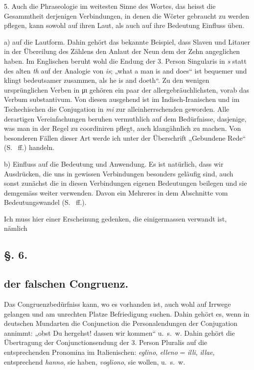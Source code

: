 {5. Auch die Phraseologie im weitesten Sinne des Wortes, das heisst die Gesammtheit derjenigen Verbindungen, in denen die Wörter gebraucht zu werden pflegen, kann sowohl auf ihren Laut, als auch auf ihre Bedeutung Einfluss üben.

a) auf die Lautform. Dahin gehört das bekannte Beispiel, dass Slaven und Litauer in der Übereilung des Zählens den Anlaut der Neun dem der Zehn angeglichen haben. Im Englischen beruht wohl die Endung der 3. Person Singularis in \textit{s} statt des alten \textit{th} auf der Analogie von \textit{is}; „what a man is and does“ ist bequemer und klingt bedeutsamer zusammen, als  he is and doeth“. Zu den wenigen ursprünglichen Verben in μι gehören ein paar der allergebräuchlichsten, vorab das Verbum substantivum. Von diesen ausgehend ist im Indisch-Iranischen und im Tschechischen die Conjugation in \textit{mi} zur alleinherrschenden geworden. Alle derartigen Vereinfachungen beruhen vermuthlich auf dem Bedürfnisse, dasjenige, was man in der Regel zu coordiniren pflegt, auch klangähnlich zu machen. Von besonderen Fällen dieser Art werde ich unter der Überschrift „Gebundene Rede“ (S.~ ff.) handeln.

b) Einfluss auf die Bedeutung und Anwendung. Es ist natürlich, dass wir Ausdrücken, die uns in gewissen Verbindungen besonders geläufig sind, auch sonst zunächst die in diesen Verbindungen eigenen Bedeutungen beilegen und \label{sp.214} sie demgemäss weiter verwenden. Davon ein Mehreres in dem Abschnitte vom Bedeutungswandel (S.~ ff.).

Ich muss hier einer Erscheinung gedenken, die einigermassen verwandt ist, nämlich

\label{fp.214}

\subsection*{§. 6.}\label{III.II.II.6}
\subsection*{der falschen Congruenz.}
Das Congruenzbedürfniss kann, wo es vorhanden ist, auch wohl auf Irrwege gelangen und am unrechten Platze Befriedigung suchen. Dahin gehört es, wenn in deutschen Mundarten die Conjunction die Personalendungen der Conjugation annimmt: „obst Du hergehst! dassen wir kommen“ u.~s.~w.  Dahin gehört  die Übertragung der Conjunctionsendung der 3. Person Pluralis auf die entsprechenden Pronomina im Italienischen: \textit{eglino}, \textit{elleno} = \textit{illi}, \textit{illae}, entsprechend \textit{hanno}, sie haben, \textit{vogliono}, sie wollen, u.~s.~w.

}
